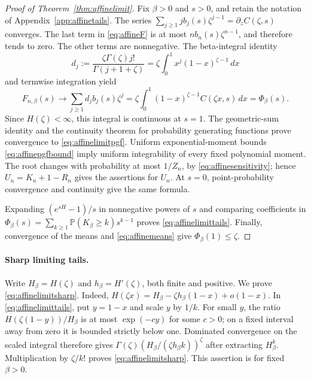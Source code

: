 \documentclass[runningheads,envcountsame,orivec]{llncs}
\newcommand{\PP}{\mathbb P}
\begin{document}
\begin{proof}[Proof of Theorem~\ref{thm:affinelimit}]
Fix $\beta>0$ and $s>0$, and retain the notation of
Appendix~\ref{app:affinetails}. The series
$\sum_{j\ge1}j b_j(s)\zeta^{j-1}=\partial_z C(\zeta,s)$ converges.
The last term in \eqref{eq:affineF} is at most
$n b_n(s)\zeta^{n-1}$, and therefore tends to zero. The other terms
are nonnegative. The beta-integral identity
\[
 d_j:=\frac{\zeta\Gamma(\zeta)j!}{\Gamma(j+1+\zeta)}
   =\zeta\int_0^1x^j(1-x)^{\zeta-1}\,dx
\]
and termwise integration yield
\[
 F_{n,\beta}(s)\longrightarrow
 \sum_{j\ge1}d_j b_j(s)\zeta^j
 =\zeta\int_0^1(1-x)^{\zeta-1}C(\zeta x,s)\,dx
 =\Phi_\beta(s).
\]
Since $H(\zeta)<\infty$, this integral is continuous at $s=1$.
The geometric-sum identity and the continuity theorem for probability
generating functions prove convergence to \eqref{eq:affinelimitpgf}.
Uniform exponential-moment bounds \eqref{eq:affinepgfbound} imply
uniform integrability of every fixed polynomial moment. The root
changes with probability at most $1/Z_n$, by
\eqref{eq:affinesensitivity}; hence $U_n=K_n+1-R_n$ gives the
assertions for $U_n$. At $s=0$, point-probability convergence and
continuity give the same formula.

Expanding $(e^{sH}-1)/s$ in nonnegative powers of $s$ and comparing
coefficients in
$\Phi_\beta(s)=\sum_{k\ge1}\PP(K_\beta\ge k)s^{k-1}$ proves
\eqref{eq:affinelimittails}. Finally, convergence of the means and
\eqref{eq:affinemeans} give $\Phi_\beta(1)\le\zeta$.
\end{proof}

\paragraph{Sharp limiting tails.}
Write $H_\beta=H(\zeta)$ and $h_\beta=H'(\zeta)$, both finite and
positive. We prove \eqref{eq:affinelimitsharp}.
Indeed, $H(\zeta x)=H_\beta-\zeta h_\beta(1-x)+o(1-x)$.
In \eqref{eq:affinelimittails}, put $y=1-x$ and scale $y$ by $1/k$.
For small $y$, the ratio $H(\zeta(1-y))/H_\beta$ is at most
$\exp(-cy)$ for some $c>0$; on a fixed interval away from zero it
is bounded strictly below one. Dominated convergence on the scaled
integral therefore gives
$\Gamma(\zeta)(H_\beta/(\zeta h_\beta k))^\zeta$ after extracting
$H_\beta^k$. Multiplication by $\zeta/k!$ proves
\eqref{eq:affinelimitsharp}. This assertion is for fixed $\beta>0$.
\end{document}
